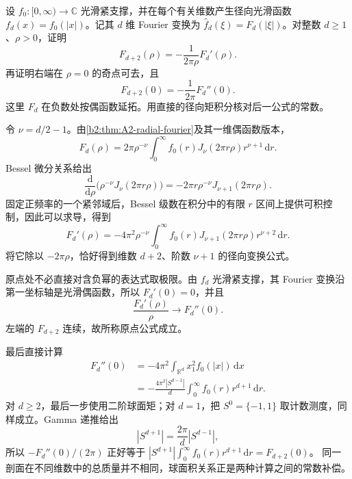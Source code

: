 \begin{exercise}\label{b2:ex:A2-dimension-raising}
设 \(f_0:[0,\infty)\to\mathbb C\) 光滑紧支撑，并在每个有关维数产生径向光滑函数
\(f_d(x)=f_0(|x|)\)。记其 \(d\) 维 Fourier 变换为
\(\widehat f_d(\xi)=F_d(|\xi|)\)。对整数 \(d\geq1\)、\(\rho>0\)，证明
\[
 F_{d+2}(\rho)=-\frac1{2\pi\rho}F_d'(\rho).
\]
再证明右端在 \(\rho=0\) 的奇点可去，且
\[
 F_{d+2}(0)=-\frac1{2\pi}F_d''(0).
\]
这里 \(F_d\) 在负数处按偶函数延拓。用直接的径向矩积分核对后一公式的常数。
\end{exercise}
\begin{solution}
令 \(\nu=d/2-1\)。由\cref{b2:thm:A2-radial-fourier}及其一维偶函数版本，
\[
 F_d(\rho)
 =2\pi\rho^{-\nu}
       \int_0^\infty f_0(r)J_\nu(2\pi r\rho)r^{\nu+1}\,\mathrm dr.
\]
Bessel 微分关系给出
\[
 \frac{\mathrm d}{\mathrm d\rho}
       \bigl(\rho^{-\nu}J_\nu(2\pi r\rho)\bigr)
 =-2\pi r\rho^{-\nu}J_{\nu+1}(2\pi r\rho).
\]
固定正频率的一个紧邻域后，Bessel 级数在积分中的有限 \(r\) 区间上提供可积控制，因此可以求导，得到
\[
 F_d'(\rho)
 =-4\pi^2\rho^{-\nu}
       \int_0^\infty f_0(r)J_{\nu+1}(2\pi r\rho)r^{\nu+2}\,\mathrm dr.
\]
将它除以 \(-2\pi\rho\)，恰好得到维数 \(d+2\)、阶数 \(\nu+1\) 的径向变换公式。

原点处不必直接对含负幂的表达式取极限。由 \(f_d\) 光滑紧支撑，其 Fourier 变换沿第一坐标轴是光滑偶函数，所以
\(F_d'(0)=0\)，并且
\[
 \frac{F_d'(\rho)}{\rho}\longrightarrow F_d''(0).
\]
左端的 \(F_{d+2}\) 连续，故所称原点公式成立。

最后直接计算
\[
 \begin{aligned}
 F_d''(0)
 &=-4\pi^2\int_{\mathbb R^d}x_1^2f_0(|x|)\,\mathrm dx\\
 &=-\frac{4\pi^2|S^{d-1}|}{d}
       \int_0^\infty f_0(r)r^{d+1}\,\mathrm dr.
 \end{aligned}
\]
对 \(d\geq2\)，最后一步使用二阶球面矩；对 \(d=1\)，把
\(S^0=\{-1,1\}\) 取计数测度，同样成立。Gamma 递推给出
\[
 |S^{d+1}|=\frac{2\pi}{d}|S^{d-1}|,
\]
所以 \(-F_d''(0)/(2\pi)\) 正好等于
\(|S^{d+1}|\int_0^\infty f_0(r)r^{d+1}\,\mathrm dr=F_{d+2}(0)\)。
同一剖面在不同维数中的总质量并不相同，球面积关系正是两种计算之间的常数补偿。
\end{solution}

